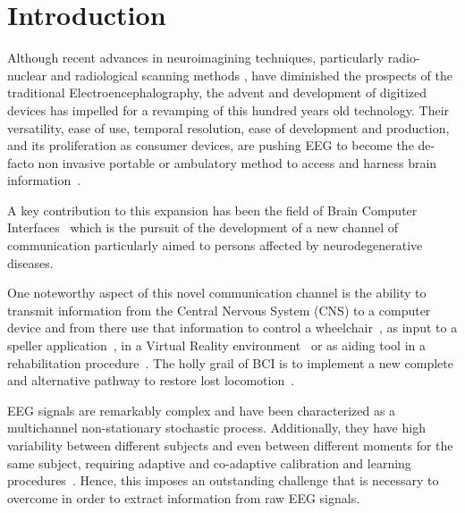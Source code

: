 \documentclass[utf8]{frontiersSCNS} %
\begin{document}
\section{Introduction}


Although recent advances in neuroimagining techniques, particularly radio-nuclear and radiological scanning methods \citep{Schomer2010}, have diminished the prospects of the traditional Electroencephalography, the advent and development of digitized devices has impelled for a revamping of this hundred years old technology.  Their versatility, ease of use, temporal resolution, ease of development and production, and its proliferation as consumer devices, are pushing EEG to become the de-facto non invasive portable or ambulatory method to access and harness brain information~\citep{DeVos2014}.

A key contribution to this expansion has been the field of Brain Computer Interfaces~\citep{WolpawJonathanR2012} which is the pursuit of the development of a new channel of communication particularly aimed to persons affected by neurodegenerative diseases.

One noteworthy aspect of this novel communication channel is the ability to transmit information from the Central Nervous System (CNS) to a computer device and from there use that information to control a wheelchair~\citep{Carlson2013}, as input to a speller application~\citep{Guger2009a}, in a Virtual Reality environment~\citep{Lotte2013} or as aiding tool in a rehabilitation procedure~\citep{Jure2016}.  The holly grail of BCI is to implement a new complete and alternative pathway to restore lost locomotion~\citep{WolpawJonathanR2012}.

EEG signals are remarkably complex and have been characterized as a multichannel non-stationary stochastic process.  Additionally, they have high variability between different subjects and even between different moments for the same subject, requiring adaptive and co-adaptive calibration and learning procedures~\citep{Clerc}.  Hence, this imposes an outstanding challenge that is necessary to overcome in order to extract information from raw EEG signals.

\end{document}

